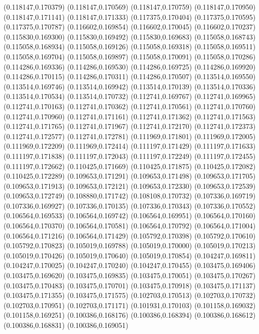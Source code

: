 (0.118147,0.170379)
(0.118147,0.170569)
(0.118147,0.170759)
(0.118147,0.170950)
(0.118147,0.171141)
(0.118147,0.171333)
(0.117375,0.170404)
(0.117375,0.170595)
(0.117375,0.170787)
(0.116602,0.169854)
(0.116602,0.170045)
(0.116602,0.170237)
(0.115830,0.169300)
(0.115830,0.169492)
(0.115830,0.169683)
(0.115058,0.168743)
(0.115058,0.168934)
(0.115058,0.169126)
(0.115058,0.169318)
(0.115058,0.169511)
(0.115058,0.169704)
(0.115058,0.169897)
(0.115058,0.170091)
(0.115058,0.170286)
(0.114286,0.169336)
(0.114286,0.169530)
(0.114286,0.169725)
(0.114286,0.169920)
(0.114286,0.170115)
(0.114286,0.170311)
(0.114286,0.170507)
(0.113514,0.169550)
(0.113514,0.169746)
(0.113514,0.169942)
(0.113514,0.170139)
(0.113514,0.170336)
(0.113514,0.170534)
(0.113514,0.170732)
(0.112741,0.169767)
(0.112741,0.169965)
(0.112741,0.170163)
(0.112741,0.170362)
(0.112741,0.170561)
(0.112741,0.170760)
(0.112741,0.170960)
(0.112741,0.171161)
(0.112741,0.171362)
(0.112741,0.171563)
(0.112741,0.171765)
(0.112741,0.171967)
(0.112741,0.172170)
(0.112741,0.172373)
(0.112741,0.172577)
(0.112741,0.172781)
(0.111969,0.171801)
(0.111969,0.172005)
(0.111969,0.172209)
(0.111969,0.172414)
(0.111197,0.171429)
(0.111197,0.171633)
(0.111197,0.171838)
(0.111197,0.172043)
(0.111197,0.172249)
(0.111197,0.172455)
(0.111197,0.172662)
(0.110425,0.171669)
(0.110425,0.171875)
(0.110425,0.172082)
(0.110425,0.172289)
(0.109653,0.171291)
(0.109653,0.171498)
(0.109653,0.171705)
(0.109653,0.171913)
(0.109653,0.172121)
(0.109653,0.172330)
(0.109653,0.172539)
(0.109653,0.172749)
(0.108880,0.171742)
(0.108108,0.170732)
(0.107336,0.169719)
(0.107336,0.169927)
(0.107336,0.170135)
(0.107336,0.170343)
(0.107336,0.170552)
(0.106564,0.169533)
(0.106564,0.169742)
(0.106564,0.169951)
(0.106564,0.170160)
(0.106564,0.170370)
(0.106564,0.170581)
(0.106564,0.170792)
(0.106564,0.171004)
(0.106564,0.171216)
(0.106564,0.171429)
(0.105792,0.170398)
(0.105792,0.170610)
(0.105792,0.170823)
(0.105019,0.169788)
(0.105019,0.170000)
(0.105019,0.170213)
(0.105019,0.170426)
(0.105019,0.170640)
(0.105019,0.170854)
(0.104247,0.169811)
(0.104247,0.170025)
(0.104247,0.170240)
(0.104247,0.170455)
(0.103475,0.169406)
(0.103475,0.169620)
(0.103475,0.169835)
(0.103475,0.170051)
(0.103475,0.170267)
(0.103475,0.170483)
(0.103475,0.170701)
(0.103475,0.170918)
(0.103475,0.171137)
(0.103475,0.171355)
(0.103475,0.171575)
(0.102703,0.170513)
(0.102703,0.170732)
(0.102703,0.170951)
(0.102703,0.171171)
(0.101931,0.170103)
(0.101158,0.169032)
(0.101158,0.169251)
(0.100386,0.168176)
(0.100386,0.168394)
(0.100386,0.168612)
(0.100386,0.168831)
(0.100386,0.169051)
